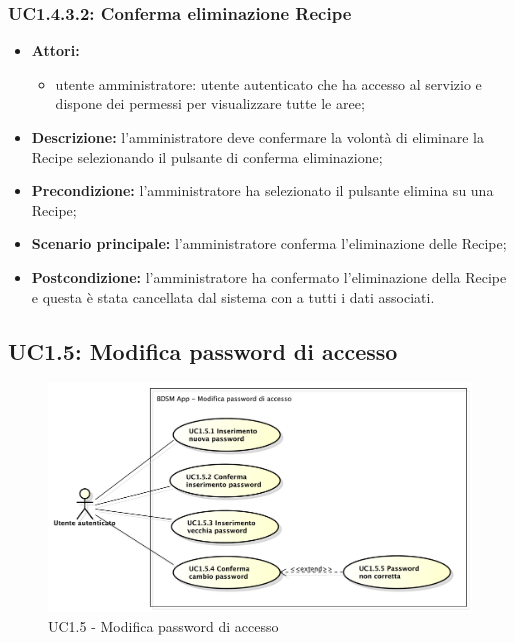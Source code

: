 \subsubsection{UC1.4.3.2: Conferma eliminazione Recipe}
\begin{itemize}
	\item \textbf{Attori:}
	\begin{itemize}
		\item utente amministratore: utente autenticato che ha accesso al servizio e dispone dei permessi per visualizzare tutte le aree;
	\end{itemize}
	\item \textbf{Descrizione:} l'amministratore deve confermare la volontà di eliminare la Recipe selezionando il pulsante di conferma eliminazione;
	\item \textbf{Precondizione:} l'amministratore ha selezionato il pulsante elimina su una Recipe;
	\item \textbf{Scenario principale:} l'amministratore conferma l'eliminazione delle Recipe;
	\item \textbf{Postcondizione:} l'amministratore ha confermato l'eliminazione della Recipe e questa è stata cancellata dal sistema con a tutti i dati associati.
\end{itemize}

\pagebreak


\subsection{UC1.5: Modifica password di accesso}
\begin{figure}[!htbp]
	\centering
	\centerline{\includegraphics[scale=0.45]{./images/UC1_5.pdf}}
	\caption{UC1.5 - Modifica password di accesso}
\end{figure}

